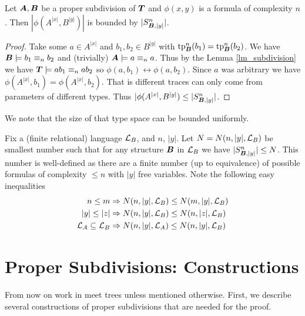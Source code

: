 \documentclass{amsart}
\DeclareMathOperator{\TT}{\boldface T}
\DeclareMathOperator{\A}{\boldface A}
\DeclareMathOperator{\B}{\boldface B}
\begin{document}
\begin{Corollary} \label{cor_type_count}
	Let $\A, \B$ be a proper subdivision of $\TT$ and $\phi(x,y)$ is a formula of complexity $n$. Then $|\phi(A^{|x|}, B^{|y|})|$ is bounded by $|S^n_{\B, |y|}|$.
\end{Corollary}

\begin{proof}
	Take some $a \in A^{|x|}$ and $b_1, b_2 \in B^{|y|}$ with $\tp^n_{\B}(b_1) = \tp^n_{\B}(b_2)$. We have $\B \models b_1 \equiv_n b_2$ and (trivially) $\A \models a \equiv_n a$. Thus by the Lemma \ref{lm_subdivision} we have $\TT \models ab_1 \equiv_n ab_2$ so $\phi(a, b_1) \leftrightarrow \phi(a, b_2)$. Since $a$ was arbitrary we have $\phi(A^{|x|}, b_1) = \phi(A^{|x|}, b_2)$. That is different traces can only come from parameters of different types. Thus $|\phi(A^{|x|}, B^{|y|}) \leq |S^n_{\B, |y|}|$.
\end{proof}

We note that the size of that type space can be bounded uniformly.

\begin{Definition} \label{def_type_count}
	Fix a (finite relational) language $\mathcal L_B$, and $n$, $|y|$. Let $N = N(n, |y|, \mathcal L_B)$ be smallest number such that for any structure $\B$ in $\mathcal L_B$ we have $|S^n_{\B, |y|}| \leq N$. This number is well-defined as there are a finite number (up to equivalence) of possible formulas of complexity $\leq n$ with $|y|$ free variables. Note the following easy inequalities
	\begin{align*}
		n \leq m &\Rightarrow N(n, |y|, \mathcal L_B) \leq N(m, |y|, \mathcal L_B) \\
		|y| \leq |z| &\Rightarrow N(n, |y|, \mathcal L_B) \leq N(n, |z|, \mathcal L_B) \\
		\mathcal L_A \subseteq \mathcal L_B &\Rightarrow N(n, |y|, \mathcal L_A) \leq N(n, |y|, \mathcal L_B)
	\end{align*}
\end{Definition}

\section{Proper Subdivisions: Constructions}

From now on work in meet trees unless mentioned otherwise. First, we describe several constructions of proper subdivisions that are needed for the proof. 
\end{document}
